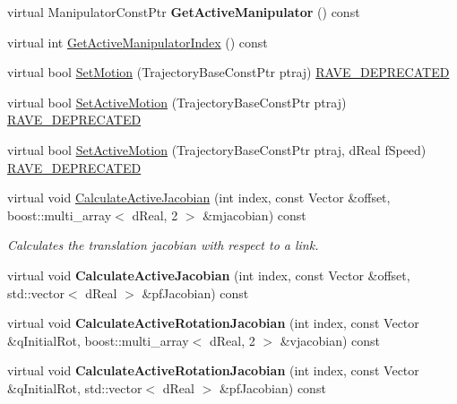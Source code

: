 \begin{DoxyCompactItemize}
\item 
\hypertarget{classOpenRAVE_1_1RobotBase_ad1f13a31373ebba2b4853f73f5125d96}{
virtual ManipulatorConstPtr {\bfseries GetActiveManipulator} () const }
\label{classOpenRAVE_1_1RobotBase_ad1f13a31373ebba2b4853f73f5125d96}

\item 
virtual int \hyperlink{classOpenRAVE_1_1RobotBase_a1b663dc6bca08704a562fdc74e25dfd0}{GetActiveManipulatorIndex} () const 
\item 
virtual bool \hyperlink{classOpenRAVE_1_1RobotBase_a53f7fcf5ff3f270a12fd9714d760bc58}{SetMotion} (TrajectoryBaseConstPtr ptraj) \hyperlink{classOpenRAVE_1_1RobotBase_ad7131b2e388f7f953e9cc14f7336c8e2}{RAVE\_\-DEPRECATED}
\item 
virtual bool \hyperlink{classOpenRAVE_1_1RobotBase_a4dfa799940ac67f7c409053aeda11346}{SetActiveMotion} (TrajectoryBaseConstPtr ptraj) \hyperlink{classOpenRAVE_1_1RobotBase_ad7131b2e388f7f953e9cc14f7336c8e2}{RAVE\_\-DEPRECATED}
\item 
virtual bool \hyperlink{classOpenRAVE_1_1RobotBase_afae0e0c1c67c2b5295255e684197bb0d}{SetActiveMotion} (TrajectoryBaseConstPtr ptraj, dReal fSpeed) \hyperlink{classOpenRAVE_1_1RobotBase_ad7131b2e388f7f953e9cc14f7336c8e2}{RAVE\_\-DEPRECATED}
\item 
virtual void \hyperlink{classOpenRAVE_1_1RobotBase_a93636f2303581a0614c9520d3351afc2}{CalculateActiveJacobian} (int index, const Vector \&offset, boost::multi\_\-array$<$ dReal, 2 $>$ \&mjacobian) const 
\begin{DoxyCompactList}\small\item\em Calculates the translation jacobian with respect to a link. \item\end{DoxyCompactList}\item 
\hypertarget{classOpenRAVE_1_1RobotBase_aac4c333a2aaf16a25405efa53c84ead8}{
virtual void {\bfseries CalculateActiveJacobian} (int index, const Vector \&offset, std::vector$<$ dReal $>$ \&pfJacobian) const }
\label{classOpenRAVE_1_1RobotBase_aac4c333a2aaf16a25405efa53c84ead8}

\item 
\hypertarget{classOpenRAVE_1_1RobotBase_adbcd635f193bc643498b99eab2ba0357}{
virtual void {\bfseries CalculateActiveRotationJacobian} (int index, const Vector \&qInitialRot, boost::multi\_\-array$<$ dReal, 2 $>$ \&vjacobian) const }
\label{classOpenRAVE_1_1RobotBase_adbcd635f193bc643498b99eab2ba0357}

\item 
\hypertarget{classOpenRAVE_1_1RobotBase_a06b2f47ecf6fd9d395cf16f24cd102f0}{
virtual void {\bfseries CalculateActiveRotationJacobian} (int index, const Vector \&qInitialRot, std::vector$<$ dReal $>$ \&pfJacobian) const }
\label{classOpenRAVE_1_1RobotBase_a06b2f47ecf6fd9d395cf16f24cd102f0}


\end{DoxyCompactItemize}
